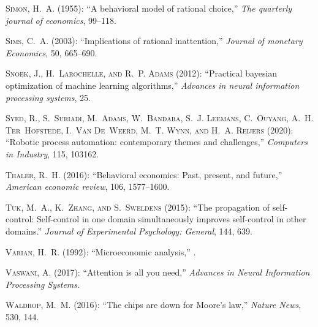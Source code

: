 \documentclass[11pt]{article}
\theoremstyle{definition}
\theoremstyle{remark}
\begin{document}
\begin{thebibliography}{70}
\textsc{Simon, H.~A.} (1955): \enquote{A behavioral model of rational choice,} \emph{The quarterly journal of economics}, 99--118.

\textsc{Sims, C.~A.} (2003): \enquote{Implications of rational inattention,} \emph{Journal of monetary Economics}, 50, 665--690.

\textsc{Snoek, J., H.~Larochelle, and R.~P. Adams} (2012): \enquote{Practical bayesian optimization of machine learning algorithms,} \emph{Advances in neural information processing systems}, 25.

\textsc{Syed, R., S.~Suriadi, M.~Adams, W.~Bandara, S.~J. Leemans, C.~Ouyang, A.~H. Ter~Hofstede, I.~Van De~Weerd, M.~T. Wynn, and H.~A. Reijers} (2020): \enquote{Robotic process automation: contemporary themes and challenges,} \emph{Computers in Industry}, 115, 103162.

\textsc{Thaler, R.~H.} (2016): \enquote{Behavioral economics: Past, present, and future,} \emph{American economic review}, 106, 1577--1600.

\textsc{Tuk, M.~A., K.~Zhang, and S.~Sweldens} (2015): \enquote{The propagation of self-control: Self-control in one domain simultaneously improves self-control in other domains.} \emph{Journal of Experimental Psychology: General}, 144, 639.

\textsc{Varian, H.~R.} (1992): \enquote{Microeconomic analysis,} .

\textsc{Vaswani, A.} (2017): \enquote{Attention is all you need,} \emph{Advances in Neural Information Processing Systems}.

\textsc{Waldrop, M.~M.} (2016): \enquote{The chips are down for Moore’s law,} \emph{Nature News}, 530, 144.


\end{thebibliography}
\end{document}
